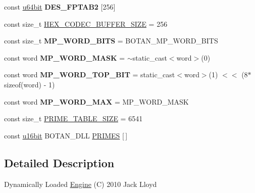 \begin{DoxyCompactItemize}
\item 
\hypertarget{namespaceBotan_a569e11fbf31939a4bffb0f1e0b98a623}{const \hyperlink{namespaceBotan_a634063d9fb05e25262ca94ed927030f6}{u64bit} {\bfseries D\-E\-S\-\_\-\-F\-P\-T\-A\-B2} \mbox{[}256\mbox{]}}\label{namespaceBotan_a569e11fbf31939a4bffb0f1e0b98a623}

\item 
const size\-\_\-t \hyperlink{namespaceBotan_a74718b9df0b68e9b2d04755c39d3b55d}{H\-E\-X\-\_\-\-C\-O\-D\-E\-C\-\_\-\-B\-U\-F\-F\-E\-R\-\_\-\-S\-I\-Z\-E} = 256
\item 
\hypertarget{namespaceBotan_a6a1185c8677fbf45b779a7643a855a9f}{const size\-\_\-t {\bfseries M\-P\-\_\-\-W\-O\-R\-D\-\_\-\-B\-I\-T\-S} = B\-O\-T\-A\-N\-\_\-\-M\-P\-\_\-\-W\-O\-R\-D\-\_\-\-B\-I\-T\-S}\label{namespaceBotan_a6a1185c8677fbf45b779a7643a855a9f}

\item 
\hypertarget{namespaceBotan_a0c38d27275dc77ce3ac9b0280398f8a5}{const word {\bfseries M\-P\-\_\-\-W\-O\-R\-D\-\_\-\-M\-A\-S\-K} = $\sim$static\-\_\-cast$<$word$>$(0)}\label{namespaceBotan_a0c38d27275dc77ce3ac9b0280398f8a5}

\item 
\hypertarget{namespaceBotan_a5f6a2a30f03aae788e45dd0807fb8904}{const word {\bfseries M\-P\-\_\-\-W\-O\-R\-D\-\_\-\-T\-O\-P\-\_\-\-B\-I\-T} = static\-\_\-cast$<$word$>$(1) $<$$<$ (8$\ast$sizeof(word) -\/ 1)}\label{namespaceBotan_a5f6a2a30f03aae788e45dd0807fb8904}

\item 
\hypertarget{namespaceBotan_a166ad6dc95d5e2034d9c769b39395626}{const word {\bfseries M\-P\-\_\-\-W\-O\-R\-D\-\_\-\-M\-A\-X} = M\-P\-\_\-\-W\-O\-R\-D\-\_\-\-M\-A\-S\-K}\label{namespaceBotan_a166ad6dc95d5e2034d9c769b39395626}

\item 
const size\-\_\-t \hyperlink{namespaceBotan_a501e4632aed1ca4799b03efff7dc59d7}{P\-R\-I\-M\-E\-\_\-\-T\-A\-B\-L\-E\-\_\-\-S\-I\-Z\-E} = 6541
\item 
const \hyperlink{namespaceBotan_ab07face63a00c39ea6ed97f203ee501c}{u16bit} B\-O\-T\-A\-N\-\_\-\-D\-L\-L \hyperlink{namespaceBotan_aba40de5bc5b2cb8a725c9c96b0e01d38}{P\-R\-I\-M\-E\-S} \mbox{[}$\,$\mbox{]}
\end{DoxyCompactItemize}


\subsection{Detailed Description}
Dynamically Loaded \hyperlink{classBotan_1_1Engine}{Engine} (C) 2010 Jack Lloyd


